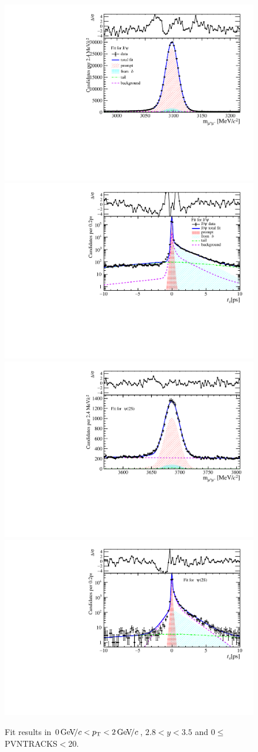 \begin{figure}[H]
\begin{center}
\includegraphics[width=0.47\linewidth]{pdf/Jpsi/drawmass/n1y2pt1.pdf}
\includegraphics[width=0.47\linewidth]{pdf/Jpsi/2DFit/n1y2pt1.pdf}
\vspace*{-0.5cm}
\includegraphics[width=0.47\linewidth]{pdf/Psi2S/drawmass/n1y2pt1.pdf}
\includegraphics[width=0.47\linewidth]{pdf/Psi2S/2DFit/n1y2pt1.pdf}
\vspace*{-0.5cm}
\end{center}
\caption{Fit results in $0\text{\,Ge\kern -0.1em V\!/}c<p_{\mathrm{T}}<2\text{\,Ge\kern -0.1em V\!/}c$, $2.8<y<3.5$ and 0$\leq$PVNTRACKS$<$20.}
\label{Fitn1y2pt1}
\end{figure}
